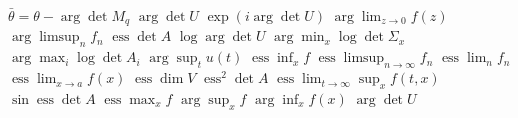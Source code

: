 \documentclass{article}
\begin{document}
$\bar\theta=\theta-\arg\det M_q$ $\arg\det U$ $\exp(i\arg\det U)$ $\arg\lim_{z\to0}f(z)$ $\arg\limsup_n f_n$ $\operatorname{ess}\det A$
$\log\arg\det U$ $\arg\min_x\log\det\Sigma_x$ $\arg\max_i\log\det A_i$ $\arg\sup_t u(t)$ $\operatorname{ess}\inf_x f$
$\operatorname{ess}\limsup_{n\to\infty}f_n$ $\operatorname{ess}\lim_n f_n$ $\operatorname{ess}\lim_{x\to a}f(x)$ $\operatorname{ess}\dim V$
$\operatorname{ess}^2\det A$ $\operatorname{ess}\lim_{t\to\infty}\sup_x f(t,x)$ $\sin\operatorname{ess}\det A$ $\operatorname{ess}\max_x f$
$\operatorname{arg}\sup_x f$ $\operatorname{arg}\inf_x f(x)$ $\operatorname{arg}\det U$

\end{document}
